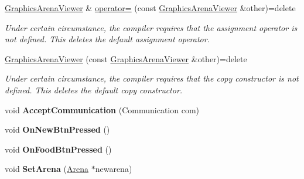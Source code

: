 \begin{DoxyCompactItemize}
\mbox{\label{class_graphics_arena_viewer_a289278f7b338fc60f983827d21b159ff}} 
\mbox{\hyperlink{class_graphics_arena_viewer}{Graphics\+Arena\+Viewer}} \& \mbox{\hyperlink{class_graphics_arena_viewer_a289278f7b338fc60f983827d21b159ff}{operator=}} (const \mbox{\hyperlink{class_graphics_arena_viewer}{Graphics\+Arena\+Viewer}} \&other)=delete
\begin{DoxyCompactList}\small\item\em Under certain circumstance, the compiler requires that the assignment operator is not defined. This {\ttfamily deletes} the default assignment operator. \end{DoxyCompactList}\item 
\mbox{\label{class_graphics_arena_viewer_afa70b72e0769db0f3f41fe37bc540621}} 
\mbox{\hyperlink{class_graphics_arena_viewer_afa70b72e0769db0f3f41fe37bc540621}{Graphics\+Arena\+Viewer}} (const \mbox{\hyperlink{class_graphics_arena_viewer}{Graphics\+Arena\+Viewer}} \&other)=delete
\begin{DoxyCompactList}\small\item\em Under certain circumstance, the compiler requires that the copy constructor is not defined. This {\ttfamily deletes} the default copy constructor. \end{DoxyCompactList}\item 
\mbox{\label{class_graphics_arena_viewer_a93fe946f83b4a2eb8d3acc056a564ebe}} 
void {\bfseries Accept\+Communication} (Communication com)
\item 
\mbox{\label{class_graphics_arena_viewer_a42639575b9092ea71946b88caf787530}} 
void {\bfseries On\+New\+Btn\+Pressed} ()
\item 
\mbox{\label{class_graphics_arena_viewer_ae7eba0a3b3f7b2bddb40b2ddc6dfc694}} 
void {\bfseries On\+Food\+Btn\+Pressed} ()
\item 
\mbox{\label{class_graphics_arena_viewer_a16e84f4e03283928557f727d67f7839a}} 
void {\bfseries Set\+Arena} (\mbox{\hyperlink{class_arena}{Arena}} $\ast$newarena)
\end{DoxyCompactItemize}


